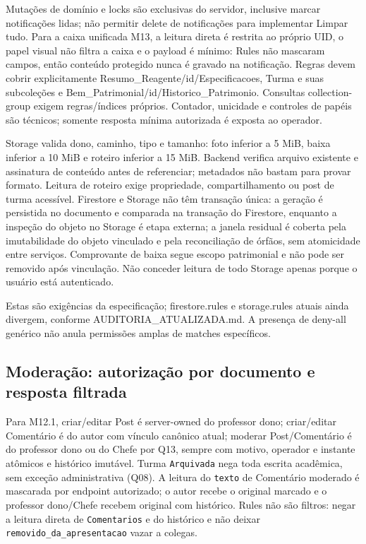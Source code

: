 Mutações de domínio e locks são exclusivas do servidor, inclusive marcar notificações lidas; não permitir delete de notificações para implementar Limpar tudo. Para a caixa unificada M13, a leitura direta é restrita ao próprio UID, o papel visual não filtra a caixa e o payload é mínimo: Rules não mascaram campos, então conteúdo protegido nunca é gravado na notificação. Regras devem cobrir explicitamente Resumo\_Reagente/id/Especificacoes, Turma e suas subcoleções e Bem\_Patrimonial/id/Historico\_Patrimonio. Consultas collection-group exigem regras/índices próprios. Contador, unicidade e controles de papéis são técnicos; somente resposta mínima autorizada é exposta ao operador.

Storage valida dono, caminho, tipo e tamanho: foto inferior a 5 MiB, baixa inferior a 10 MiB e roteiro inferior a 15 MiB. Backend verifica arquivo existente e assinatura de conteúdo antes de referenciar; metadados não bastam para provar formato. Leitura de roteiro exige propriedade, compartilhamento ou post de turma acessível. Firestore e Storage não têm transação única: a geração é persistida no documento e comparada na transação do Firestore, enquanto a inspeção do objeto no Storage é etapa externa; a janela residual é coberta pela imutabilidade do objeto vinculado e pela reconciliação de órfãos, sem atomicidade entre serviços. Comprovante de baixa segue escopo patrimonial e não pode ser removido após vinculação. Não conceder leitura de todo Storage apenas porque o usuário está autenticado.

Estas são exigências da especificação; firestore.rules e storage.rules atuais ainda divergem, conforme AUDITORIA\_ATUALIZADA.md. A presença de deny-all genérico não anula permissões amplas de matches específicos.

\subsection{Moderação: autorização por documento e resposta filtrada}
Para M12.1, criar/editar Post é server-owned do professor dono; criar/editar
Comentário é do autor com vínculo canônico atual; moderar Post/Comentário é do
professor dono ou do Chefe por Q13, sempre com motivo, operador e instante
atômicos e histórico imutável. Turma \texttt{Arquivada} nega toda escrita
acadêmica, sem exceção administrativa (Q08). A leitura do \texttt{texto} de
Comentário moderado é mascarada por endpoint autorizado; o autor recebe o
original marcado e o professor dono/Chefe recebem original com histórico. Rules
não são filtros: negar a leitura direta de \texttt{Comentarios} e do histórico
e não deixar \texttt{removido\_da\_apresentacao} vazar a colegas.

